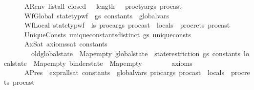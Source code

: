 \begin{isabellebody}
\ \ \ \ \ \ ARenv{\isacharcolon}{\kern0pt}\ {\isachardoublequoteopen}list{\isacharunderscore}{\kern0pt}all\ closed\ {\isasymOmega}\ {\isasymand}\ length\ {\isasymOmega}\ {\isacharequal}{\kern0pt}\ proc{\isacharunderscore}{\kern0pt}ty{\isacharunderscore}{\kern0pt}args\ proc{\isacharunderscore}{\kern0pt}ast{\isachardoublequoteclose}\ \isanewline
\ \ \ \ \ \ WfGlobal{\isacharcolon}{\kern0pt}\ {\isachardoublequoteopen}state{\isacharunderscore}{\kern0pt}typ{\isacharunderscore}{\kern0pt}wf\ {\isasymOmega}\ gs\ {\isacharparenleft}{\kern0pt}constants\ {\isacharat}{\kern0pt}\ global{\isacharunderscore}{\kern0pt}vars{\isacharparenright}{\kern0pt}{\isachardoublequoteclose}\ \isanewline
\ \ \ \ \ \ WfLocal{\isacharcolon}{\kern0pt}\ {\isachardoublequoteopen}state{\isacharunderscore}{\kern0pt}typ{\isacharunderscore}{\kern0pt}wf\ {\isasymOmega}\ ls\ {\isacharparenleft}{\kern0pt}proc{\isacharunderscore}{\kern0pt}args\ proc{\isacharunderscore}{\kern0pt}ast\ {\isacharat}{\kern0pt}\ locals\ {\isacharat}{\kern0pt}\ proc{\isacharunderscore}{\kern0pt}rets\ proc{\isacharunderscore}{\kern0pt}ast{\isacharparenright}{\kern0pt}{\isachardoublequoteclose}\ \isanewline
\ \ \ \ \ \ UniqueConsts{\isacharcolon}{\kern0pt}\ {\isachardoublequoteopen}unique{\isacharunderscore}{\kern0pt}constants{\isacharunderscore}{\kern0pt}distinct\ gs\ unique{\isacharunderscore}{\kern0pt}consts{\isachardoublequoteclose}\ \isanewline
\ \ \ \ \ \ AxSat{\isacharcolon}{\kern0pt}\ {\isachardoublequoteopen}axioms{\isacharunderscore}{\kern0pt}sat\ {\isacharparenleft}{\kern0pt}constants{\isacharcomma}{\kern0pt}\ {\isacharbrackleft}{\kern0pt}{\isacharbrackright}{\kern0pt}{\isacharparenright}{\kern0pt}\ {\isasymGamma}\isanewline
\ \ \ \ \ \ \ \ {\isasymlparr}old{\isacharunderscore}{\kern0pt}global{\isacharunderscore}{\kern0pt}state\ {\isacharequal}{\kern0pt}\ Map{\isachardot}{\kern0pt}empty{\isacharcomma}{\kern0pt}\ global{\isacharunderscore}{\kern0pt}state\ {\isacharequal}{\kern0pt}\ state{\isacharunderscore}{\kern0pt}restriction\ gs\ constants{\isacharcomma}{\kern0pt}\ local{\isacharunderscore}{\kern0pt}state\ {\isacharequal}{\kern0pt}\ Map{\isachardot}{\kern0pt}empty{\isacharcomma}{\kern0pt}\ binder{\isacharunderscore}{\kern0pt}state\ {\isacharequal}{\kern0pt}\ Map{\isachardot}{\kern0pt}empty{\isasymrparr}\isanewline
\ \ \ \ \ \ \ \ axioms{\isachardoublequoteclose}\ \isanewline
\ \ \ \ \ \ APres{\isacharcolon}{\kern0pt}\ \ {\isachardoublequoteopen}expr{\isacharunderscore}{\kern0pt}all{\isacharunderscore}{\kern0pt}sat\ {\isacharparenleft}{\kern0pt}constants\ {\isacharat}{\kern0pt}\ global{\isacharunderscore}{\kern0pt}vars{\isacharcomma}{\kern0pt}\ proc{\isacharunderscore}{\kern0pt}args\ proc{\isacharunderscore}{\kern0pt}ast\ {\isacharat}{\kern0pt}\ locals\ {\isacharat}{\kern0pt}\ proc{\isacharunderscore}{\kern0pt}rets\ proc{\isacharunderscore}{\kern0pt}ast{\isacharparenright}{\kern0pt}\ {\isasymGamma}\ {\isasymOmega}\isanewline

\end{isabellebody}
